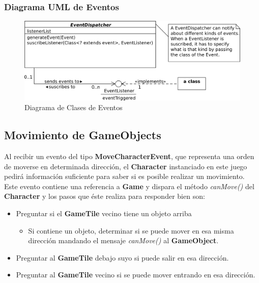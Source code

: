 \documentclass[a4paper,12pt,titlepage]{article}
\begin{document}
\subsubsection{Diagrama UML de Eventos}

\begin{center}
	\begin{figure}[h]
		\center \includegraphics{EventClassDiagram.png}
		\caption{Diagrama de Clases de Eventos}
	\end{figure}
\end{center}

\subsection{Movimiento de \textbf{GameObjects}}

Al recibir un evento del tipo \textbf{MoveCharacterEvent}, que representa una orden de moverse en determinada dirección, el \textbf{Character} instanciado en este juego pedirá información suficiente para saber si es posible realizar un movimiento.
Este evento contiene una referencia a \textbf{Game} y dispara el método \emph{canMove()} del \textbf{Character} y los pasos que éste realiza para responder bien son:

\begin{itemize}
 \item Preguntar si el \textbf{GameTile} vecino tiene un objeto arriba
 \begin{itemize}
  \item Si contiene un objeto, determinar si se puede mover en esa misma dirección mandando el mensaje \textit{canMove()} al \textbf{GameObject}.
 \end{itemize}
 \item Preguntar al \textbf{GameTile} debajo suyo si puede salir en esa dirección.
 \item Preguntar al \textbf{GameTile} vecino si se puede mover entrando en esa dirección.
\end{itemize}
\end{document}
